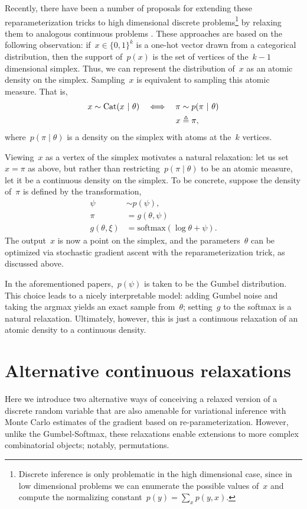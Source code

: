 \documentclass{article}
\begin{document}
Recently, there have been a number of proposals for extending these
reparameterization tricks to high dimensional discrete
problems\footnote{Discrete inference is only problematic in the high
dimensional case, since in low dimensional problems we can enumerate
the possible values of~$x$ and compute the normalizing constant~$p(y)
= \sum_x p(y, x)$.} by relaxing them to analogous continuous
problems \citep{maddison2016concrete, jang2016categorical,
kusner2016gans}.  These approaches are based on the following
observation: if~$x \in \{0,1\}^k$ is a one-hot vector drawn from a
categorical distribution, then the support of~$p(x)$ is the set of
vertices of the~$k-1$ dimensional simplex.  Thus, we can represent the
distribution of~$x$ as an atomic density on the simplex.  Sampling~$x$
is equivalent to sampling this atomic measure. That is,
\begin{align}
  x &\sim \mathrm{Cat}( x ~\vert~ \theta) &\iff& & {\pi} &\sim p({\pi} ~\vert~ \theta) \nonumber \\
  & & & & x &\triangleq {\pi},
\end{align}
where~$p({\pi} \mid \theta)$ is a density on the simplex with atoms at
the~$k$ vertices.

Viewing~$x$ as a vertex of the simplex motivates a natural relaxation:
let us set~$x={\pi}$ as above, but 
rather than restricting~$p({\pi} \mid \theta)$ to be an atomic measure,
let it be a continuous density on the simplex. To be concrete, suppose
the density of~${\pi}$ is defined by the transformation,
\begin{align}
  \psi &\sim p(\psi), \\
  {\pi} &= g(\theta, \psi) \\
  g(\theta, \xi) &= \text{softmax}(\log \theta + \psi).
\end{align}
The output~$x$ is now a point on the simplex, and the parameters~$\theta$ can
be optimized via stochastic gradient ascent with the reparameterization trick,
as discussed above.

In the aforementioned papers,~$p(\psi)$ is taken to be the Gumbel distribution.
This choice leads to a nicely interpretable model: adding
Gumbel noise and taking the argmax yields an exact sample from~$\theta$;
setting~$g$ to the softmax is a natural relaxation. Ultimately, however, this
is just a continuous relaxation of an atomic density to a continuous
density. 

\section{Alternative continuous relaxations}
\label{sec:alternative}
Here we introduce two alternative ways of conceiving a relaxed version of a discrete random variable that are also amenable for variational inference with Monte Carlo estimates of the gradient based on re-parameterization. However, unlike the Gumbel-Softmax, these relaxations enable extensions to more complex combinatorial objects; notably, permutations.
\end{document}
